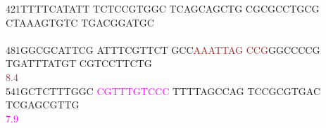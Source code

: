 \documentclass[11pt,twoside,reqno,a4paper]{article}
\begin{document}
{421\hspace*{1\charwidth}TTTTCATATT	TCTCCGTGGC	TCAGCAGCTG	CGCGCCTGCG	CTAAAGTGTC	TGACGGATGC	\\
\hspace*{4\charwidth}\hspace*{1\charwidth}\hspace*{1\charwidth}\hspace*{1\charwidth}\hspace*{1\charwidth}\hspace*{1\charwidth}\hspace*{1\charwidth}\\
481\hspace*{1\charwidth}GGCGCATTCG	ATTTCGTTCT	GCC\textcolor{brown}{A}\textcolor{brown}{A}\textcolor{brown}{A}\textcolor{brown}{T}\textcolor{brown}{T}\textcolor{brown}{A}\textcolor{brown}{G}	\textcolor{brown}{C}\textcolor{brown}{C}\textcolor{brown}{G}GGCCCCG	TGATTTATGT	CGTCCTTCTG	\\
\hspace*{4\charwidth}\hspace*{1\charwidth}\hspace*{1\charwidth}\hspace*{23\charwidth}\textcolor{brown}{8.4}\hspace*{1\charwidth}\hspace*{1\charwidth}\hspace*{1\charwidth}\hspace*{1\charwidth}\\
541\hspace*{1\charwidth}GCTCTTTGGC	\textcolor{magenta}{C}\textcolor{magenta}{G}\textcolor{magenta}{T}\textcolor{magenta}{T}\textcolor{magenta}{T}\textcolor{magenta}{G}\textcolor{magenta}{T}\textcolor{magenta}{C}\textcolor{magenta}{C}\textcolor{magenta}{C}	TTTTAGCCAG	TCCGCGTGAC	TCGAGCGTTG	\\
\hspace*{4\charwidth}\hspace*{1\charwidth}\hspace*{10\charwidth}\textcolor{magenta}{7.9}\hspace*{1\charwidth}\hspace*{1\charwidth}\hspace*{1\charwidth}\hspace*{1\charwidth}\\
}
\\
\end{document}
